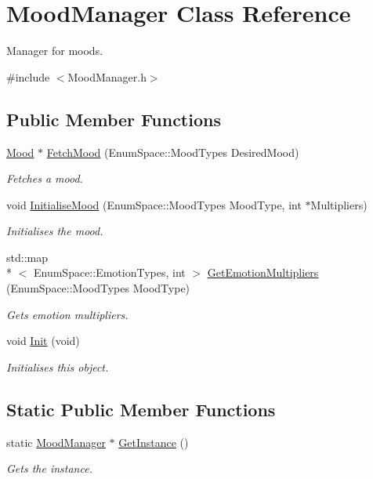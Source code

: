 \hypertarget{class_mood_manager}{\section{Mood\-Manager Class Reference}
\label{class_mood_manager}
}


Manager for moods.  




{\ttfamily \#include $<$Mood\-Manager.\-h$>$}

\subsection*{Public Member Functions}
\begin{DoxyCompactItemize}
\item 
\hyperlink{class_mood}{Mood} $\ast$ \hyperlink{class_mood_manager_a6124f65e1bd75b7025f1475e4e9a6577}{Fetch\-Mood} (Enum\-Space\-::\-Mood\-Types Desired\-Mood)
\begin{DoxyCompactList}\small\item\em Fetches a mood. \end{DoxyCompactList}\item 
void \hyperlink{class_mood_manager_a76b0af2237a77cc73a108ccd283de0ae}{Initialise\-Mood} (Enum\-Space\-::\-Mood\-Types Mood\-Type, int $\ast$Multipliers)
\begin{DoxyCompactList}\small\item\em Initialises the mood. \end{DoxyCompactList}\item 
std\-::map\\*
$<$ Enum\-Space\-::\-Emotion\-Types, int $>$ \hyperlink{class_mood_manager_a6e5c7fd531f190049e5c2be208f62dce}{Get\-Emotion\-Multipliers} (Enum\-Space\-::\-Mood\-Types Mood\-Type)
\begin{DoxyCompactList}\small\item\em Gets emotion multipliers. \end{DoxyCompactList}\item 
void \hyperlink{class_mood_manager_a401c3008ed0fe50c3766963ced3c5a21}{Init} (void)
\begin{DoxyCompactList}\small\item\em Initialises this object. \end{DoxyCompactList}\end{DoxyCompactItemize}
\subsection*{Static Public Member Functions}
\begin{DoxyCompactItemize}
\item 
static \hyperlink{class_mood_manager}{Mood\-Manager} $\ast$ \hyperlink{class_mood_manager_a66be018d05402aaeb081411cbe6fc27b}{Get\-Instance} ()
\begin{DoxyCompactList}\small\item\em Gets the instance. \end{DoxyCompactList}\end{DoxyCompactItemize}


